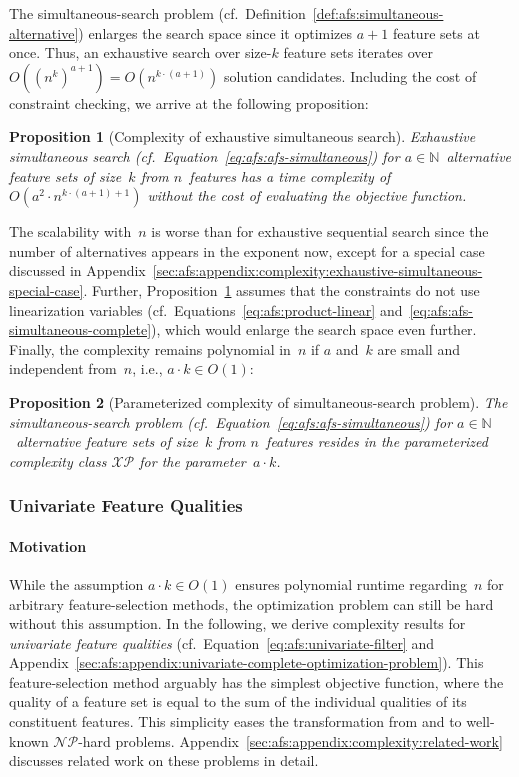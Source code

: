 \documentclass{article}
\newtheorem{proposition}{Proposition}
\theoremstyle{definition}
\begin{document}
The simultaneous-search problem (cf.~Definition~\ref{def:afs:simultaneous-alternative}) enlarges the search space since it optimizes $a+1$ feature sets at once.
Thus, an exhaustive search over size-$k$ feature sets iterates over~$O((n^k)^{a+1}) = O(n^{k \cdot (a+1)})$ solution candidates.
Including the cost of constraint checking, we arrive at the following proposition:
%
\begin{proposition}[Complexity of exhaustive simultaneous search]
	Exhaustive simultaneous search (cf.~Equation~\ref{eq:afs:afs-simultaneous}) for $a \in \mathbb{N}$~alternative feature sets of size~$k$ from $n$~features has a time complexity of~$O(a^2 \cdot n^{k \cdot (a+1) + 1})$ without the cost of evaluating the objective function.
	\label{prop:afs:complexity-exhaustive-simultaneuos}
\end{proposition}
%
The scalability with~$n$ is worse than for exhaustive sequential search since the number of alternatives appears in the exponent now, except for a special case discussed in Appendix~\ref{sec:afs:appendix:complexity:exhaustive-simultaneous-special-case}.
Further, Proposition~\ref{prop:afs:complexity-exhaustive-simultaneuos} assumes that the constraints do not use linearization variables (cf.~Equations~\ref{eq:afs:product-linear} and~\ref{eq:afs:afs-simultaneous-complete}), which would enlarge the search space even further.
Finally, the complexity remains polynomial in~$n$ if $a$ and~$k$ are small and independent from~$n$, i.e., $a \cdot k \in O(1)$:
%
\begin{proposition}[Parameterized complexity of simultaneous-search problem]
	The simultaneous-search problem (cf.~Equation~\ref{eq:afs:afs-simultaneous}) for $a \in \mathbb{N}$~alternative feature sets of size~$k$ from $n$~features resides in the parameterized complexity class $\mathcal{XP}$ for the parameter~$a \cdot k$.
	\label{prop:afs:complexity-simultaneuos-xp}
\end{proposition}

\subsubsection{Univariate Feature Qualities}
\label{sec:afs:approach:complexity:univariate}

\paragraph{Motivation}

While the assumption $a \cdot k \in O(1)$ ensures polynomial runtime regarding~$n$ for arbitrary feature-selection methods, the optimization problem can still be hard without this assumption.
In the following, we derive complexity results for \emph{univariate feature qualities} (cf.~Equation~\ref{eq:afs:univariate-filter} and Appendix~\ref{sec:afs:appendix:univariate-complete-optimization-problem}).
This feature-selection method arguably has the simplest objective function, where the quality of a feature set is equal to the sum of the individual qualities of its constituent features.
This simplicity eases the transformation from and to well-known $\mathcal{NP}$-hard problems.
Appendix~\ref{sec:afs:appendix:complexity:related-work} discusses related work on these problems in detail.
\end{document}
